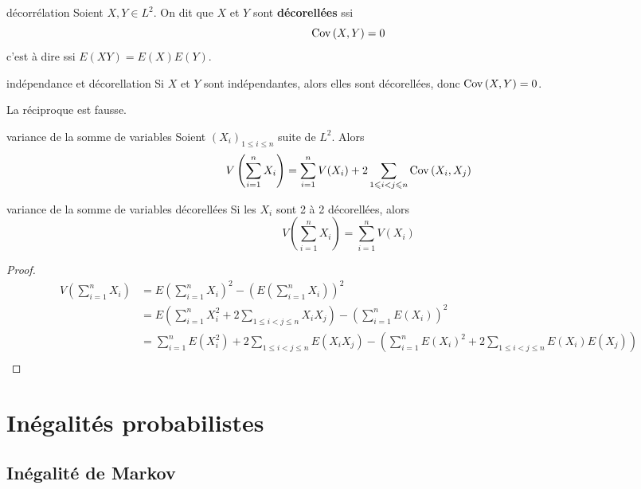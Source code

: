 \begin{definition}{décorrélation}{}
    Soient $X, Y \in L^2$. On dit que $X$ et $Y$ sont \textbf{décorellées} ssi 
    $$ \operatorname{Cov} \,(X, Y) = 0 $$
    c'est à dire ssi $E(XY) = E(X) E(Y)$.
\end{definition}

\begin{proposition}{indépendance et décorellation}{}
    Si $X$ et $Y$ sont indépendantes, alors elles sont décorellées, donc $\operatorname{Cov} \,(X, Y) = 0$.
\end{proposition}

\begin{remarque}
    La réciproque est fausse. 
\end{remarque}

\begin{theoreme}{variance de la somme de variables}{}
    Soient $(X_i)_{1 \leqslant i \leqslant n}$ suite de $L^2$. Alors 
    $$ V\left( \sum_{i = 1}^n X_i \right) = \sum_{i = 1}^n V(X_i) + 2 \sum_{1 \leqslant i < j \leqslant n} \operatorname{Cov} \,(X_i, X_j) $$
\end{theoreme}

\begin{corollaire}{variance de la somme de variables décorellées}{}
    Si les $X_i$ sont 2 à 2 décorellées, alors
    $$ V\left( \sum_{i = 1}^n X_i \right) = \sum_{i = 1}^n V(X_i) $$
\end{corollaire}

\begin{proof}
    \begin{align}
        V \left( \sum_{i = 1}^n X_i \right) & = E \left( \sum_{i = 1}^n X_i \right)^2 - \left( E \left( \sum_{i = 1}^n X_i \right) \right)^2 \\
        & = E \left( \sum_{i = 1}^n X_i^2 + 2 \sum_{1 \leqslant i < j \leqslant n} X_i X_j \right) - \left( \sum_{i = 1}^n E(X_i) \right)^2 \\
        & = \sum_{i = 1}^n E(X_i^2) + 2 \sum_{1 \leqslant i < j \leqslant n} E(X_i X_j) - \left( \sum_{i = 1}^n E(X_i)^2 + 2 \sum_{1 \leqslant i < j \leqslant n} E(X_i) E(X_j) \right) \\
    \end{align}
\end{proof}

\section{Inégalités probabilistes }
\subsection{Inégalité de Markov}

